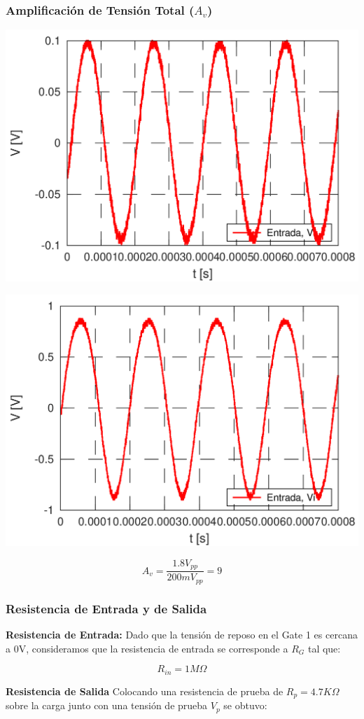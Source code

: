 \documentclass[a4paper, 10pt, spanish]{article}
\begin{document}
\subsubsection{Amplificación de Tensión Total ($A_v$)}

\begin{center}
  \includegraphics[width=.5\textwidth]{vi.png}
  \label{fig:vi_med}
\end{center}

\begin{center}
  \includegraphics[width=.5\textwidth]{vo.png}
  \label{fig:vo_med}
\end{center}


\begin{equation}
  A_v=\frac{1.8V_{pp}}{200mV_{pp}}=9
\end{equation}

\subsubsection{Resistencia de Entrada y de Salida}
\textbf{Resistencia de Entrada:}
Dado que la tensión de reposo en el Gate 1 es cercana a 0V, consideramos que la resistencia de entrada se corresponde a $R_G$ tal que:

\begin{equation}
  R_{in}=1M\Omega
\end{equation}

\textbf{Resistencia de Salida}
Colocando una resistencia de prueba de $R_p = 4.7K\Omega$ sobre la carga junto con una tensión de prueba $V_p$ se obtuvo:
\end{document}
